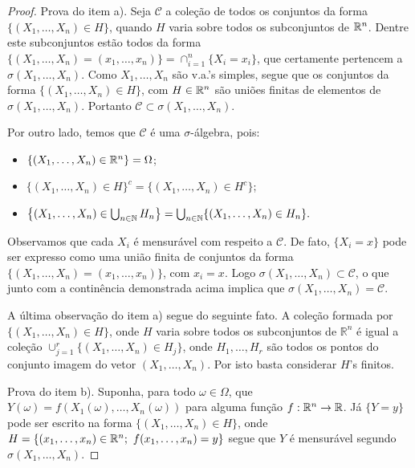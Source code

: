 \begin{proof}
Prova do item a). Seja $\mathcal{C}$ a coleção de todos os conjuntos da forma 
$\{(X_1,\ldots,X_n)\in H\}$, quando $H$ varia sobre todos os 
subconjuntos de $\mathbb{R}^n$. 
Dentre este subconjuntos estão todos da forma 
$\{(X_1,\ldots,X_n)=(x_1,\ldots,x_n)\}=\cap_{i=1}^n \{X_i=x_i\}$,
que certamente pertencem a $\sigma(X_1,\ldots,X_n)$.
Como $X_1,\ldots,X_n$ são v.a.'s simples, segue que os conjuntos da 
forma $\{(X_1,\ldots,X_n)\in H\}$, com $H\in \mathbb{R}^n$ são uniões 
finitas de elementos de $\sigma(X_1,\ldots,X_n)$.
Portanto $\mathcal{C}\subset \sigma(X_1,\ldots,X_n)$.


Por outro lado, temos que $\mathcal{C}$ é uma $\sigma$-álgebra,
pois: 
\begin{itemize}
\item
$\{(X_1,\ldots,X_n)\in \mathbb{R}^n\}=\Omega$; 

\item
$\{(X_1,\ldots,X_n)\in H\}^c = \{(X_1,\ldots,X_n)\in H^c\}$;

\item 
$
\left\{ (X_1,\ldots,X_n)\in \bigcup_{n\in \mathbb{N}} H_n \right\} 
=
\bigcup_{n\in \mathbb{N}}\{(X_1,\ldots,X_n)\in H_n\}.
$
\end{itemize}
Observamos que cada $X_i$ é mensurável com respeito a
$\mathcal{C}$. De fato, $\{X_i=x\}$ pode ser expresso 
como uma união finita de conjuntos da forma 
$\{(X_1,\ldots,X_n)=(x_1,\ldots,x_n)\}$, com $x_i=x$.
Logo $\sigma(X_1,\ldots,X_n)\subset \mathcal{C}$, 
o que junto com a continência demonstrada acima
implica que $\sigma(X_1,\ldots,X_n)= \mathcal{C}$.

A última observação do item a) 
segue do seguinte fato. 
A coleção formada por 
$\{(X_1,\ldots,X_n)\in H\}$, onde $H$ varia sobre todos 
os subconjuntos de $\mathbb{R}^n$ é igual 
a coleção $\cup_{j=1}^r\{(X_1,\ldots,X_n)\in H_j\}$,
onde $H_1,\ldots, H_r$ são todos os pontos
do conjunto imagem do vetor $(X_1,\ldots,X_n)$.
Por isto basta considerar $H$'s finitos.  



Prova do item b). Suponha, para todo $\omega\in\Omega$, que
$Y(\omega)=f(X_1(\omega),\ldots,X_n(\omega))$ para
alguma função $f:\mathbb{R}^n\to\mathbb{R}$. 
Já $\{Y=y\}$ pode ser escrito na forma $\{(X_1,\ldots,X_n)\in H\}$,
onde $H=\{(x_1,\ldots,x_n)\in \R^n ;\ f(x_1,\ldots,x_n)=y\}$
segue que $Y$ é mensurável segundo $\sigma(X_1,\ldots,X_n)$.



\end{proof}
